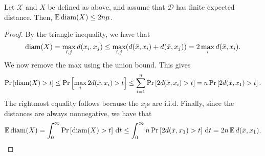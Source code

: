 \documentclass[../main.tex]{subfiles}
\newcommand{\set}[1]{\mathcal {#1}}
\newcommand{\distribution}[1]{\mathcal {#1}}
\newcommand{\dist}[2]{\distf({#1},{#2})}
\newcommand{\distf}{d}
\newcommand{\diam}[1]{\textnormal{diam}({#1})}
\begin{document}
\begin{lemma}
    \label{lemma:Ediam}
    Let $\set X$ and $X$ be defined as above,
    and assume that $\distribution D$ has finite expected distance.
    Then, $\E\diam{X} \le 2n\mu$.
\end{lemma}

\begin{proof}
    By the triangle inequality, we have that
    \begin{equation*}
        \diam{X}
        = 
        \max_{i,j} \dist{x_i}{x_j}
        \le
        \max_{i,j} (\dist{\bar x}{x_i} + \dist{\bar x}{x_j})
        =
        2\max_i \dist{\bar x}{x_i}
        .
    \end{equation*}
    We now remove the max using the union bound.
    This gives
    \begin{equation*}
        \prob{\diam{X} > t}
        \le
        \prob{\max_i 2\dist{\bar x}{x_i} > t}
        \le
        \sum_{i=1}^n\prob{2\dist{\bar x}{x_i} > t}
        \label{eq:Ediamub}
        =
        n\prob{2\dist{\bar x}{x_1} > t}
        .
    \end{equation*}
    The rightmost equality follows because the $x_i$s are i.i.d.
    Finally, since the distances are always nonnegative, we have that
    \begin{equation*}
        \E\diam{X} 
        = 
        \int_0^\infty \prob{\diam{X} > t} \dd t
        \le
        \int_0^\infty n\prob{2\dist{\bar x}{x_1} > t} \dd t
        =
        2n \E\dist{\bar x}{x_1}
        .
    \end{equation*}
\end{proof}

\end{document}
